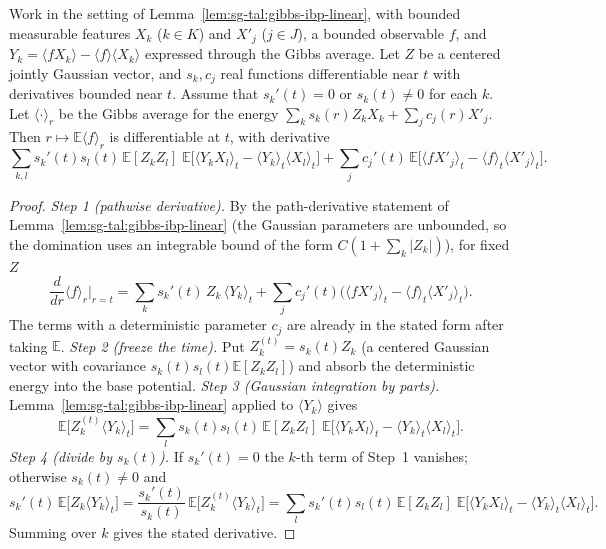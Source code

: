 \begin{lemma}\label{lem:sg-tal:gibbs-cavity-path}
\leanok
{}
Work in the setting of Lemma~\ref{lem:sg-tal:gibbs-ibp-linear}, with bounded measurable features $X_k$ ($k\in K$) and $X'_j$ ($j\in J$), a bounded observable $f$, and $Y_k=\langle fX_k\rangle-\langle f\rangle\langle X_k\rangle$ expressed through the Gibbs average.
Let $Z$ be a centered jointly Gaussian vector, and $s_k,c_j$ real functions differentiable near $t$ with derivatives bounded near $t$.
Assume that $s_k'(t)=0$ or $s_k(t)\ne0$ for each $k$.
Let $\langle\cdot\rangle_r$ be the Gibbs average for the energy $\sum_k s_k(r)Z_kX_k+\sum_j c_j(r)X'_j$.
Then $r\mapsto\mathbb E\langle f\rangle_r$ is differentiable at $t$, with derivative
\[
\sum_{k,l}s_k'(t)s_l(t)\,\mathbb E[Z_kZ_l]\;\mathbb E\bigl[\langle Y_kX_l\rangle_t-\langle Y_k\rangle_t\langle X_l\rangle_t\bigr]
+\sum_j c_j'(t)\,\mathbb E\bigl[\langle fX'_j\rangle_t-\langle f\rangle_t\langle X'_j\rangle_t\bigr].
\]
\end{lemma}
\begin{proof}
\leanok
\emph{Step 1 (pathwise derivative).} By the path-derivative statement of Lemma~\ref{lem:sg-tal:gibbs-ibp-linear} (the Gaussian parameters are unbounded, so the domination uses an integrable bound of the form $C(1+\sum_k|Z_k|)$), for fixed $Z$
\[
\frac d{dr}\langle f\rangle_r\Big|_{r=t}=\sum_ks_k'(t)\,Z_k\,\langle Y_k\rangle_t+\sum_jc_j'(t)\Big(\langle fX'_j\rangle_t-\langle f\rangle_t\langle X'_j\rangle_t\Big).
\]
The terms with a deterministic parameter $c_j$ are already in the stated form after taking $\mathbb E$.
\emph{Step 2 (freeze the time).} Put $Z^{(t)}_k=s_k(t)Z_k$ (a centered Gaussian vector with covariance $s_k(t)s_l(t)\mathbb E[Z_kZ_l]$) and absorb the deterministic energy into the base potential.
\emph{Step 3 (Gaussian integration by parts).} Lemma~\ref{lem:sg-tal:gibbs-ibp-linear} applied to $\langle Y_k\rangle$ gives
\[
\mathbb E\big[Z^{(t)}_k\langle Y_k\rangle_t\big]=\sum_l s_k(t)s_l(t)\,\mathbb E[Z_kZ_l]\;\mathbb E\big[\langle Y_kX_l\rangle_t-\langle Y_k\rangle_t\langle X_l\rangle_t\big].
\]
\emph{Step 4 (divide by $s_k(t)$).} If $s_k'(t)=0$ the $k$-th term of Step~1 vanishes; otherwise $s_k(t)\ne0$ and
\[
s_k'(t)\,\mathbb E\big[Z_k\langle Y_k\rangle_t\big]=\frac{s_k'(t)}{s_k(t)}\,\mathbb E\big[Z^{(t)}_k\langle Y_k\rangle_t\big]=\sum_l s_k'(t)s_l(t)\,\mathbb E[Z_kZ_l]\;\mathbb E\big[\langle Y_kX_l\rangle_t-\langle Y_k\rangle_t\langle X_l\rangle_t\big].
\]
Summing over $k$ gives the stated derivative.
\end{proof}


